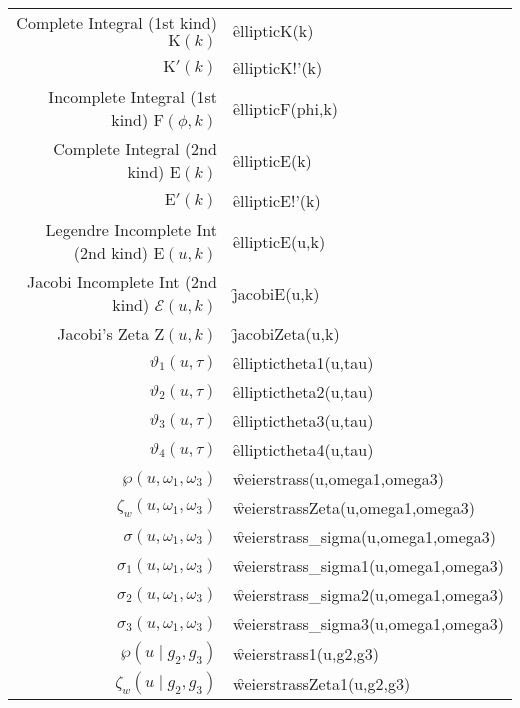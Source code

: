 {\begin{tabular}{r l}
Complete Integral (1st kind) $\mathrm{K}(k)$ & \f{ellipticK(k)}\\
$\mathrm{K}'(k)$ & \f{ellipticK!'(k)}\\
Incomplete Integral (1st kind) $\mathrm{F}(\phi,k)$ & \f{ellipticF(phi,k)}\\
Complete Integral (2nd kind) $\mathrm{E}(k)$ & \f{ellipticE(k)}\\
$\mathrm{E}'(k)$ & \f{ellipticE!'(k)}\\
Legendre Incomplete Int (2nd kind) $\mathrm{E}(u,k)$ & \f{ellipticE(u,k)}\\
Jacobi Incomplete Int (2nd kind) $\mathcal{E}(u,k)$ & \f{jacobiE(u,k)}\\
Jacobi's Zeta $\mathrm{Z}(u,k)$ & \f{jacobiZeta(u,k)}\\
$\vartheta_1(u,\tau)$ & \f{elliptictheta1(u,tau)}\\
$\vartheta_2(u,\tau)$ & \f{elliptictheta2(u,tau)}\\
$\vartheta_3(u,\tau)$ & \f{elliptictheta3(u,tau)}\\
$\vartheta_4(u,\tau)$ & \f{elliptictheta4(u,tau)}\\
$\wp(u,\omega_1, \omega_3)$ & \f{weierstrass(u,omega1,omega3)}\\
$\zeta_w(u,\omega_1, \omega_3)$ & \f{weierstrassZeta(u,omega1,omega3)}\\
$\sigma(u,\omega_1, \omega_3)$ & \f{weierstrass\_sigma(u,omega1,omega3)}\\
$\sigma_1(u,\omega_1, \omega_3)$ & \f{weierstrass\_sigma1(u,omega1,omega3)}\\
$\sigma_2(u,\omega_1, \omega_3)$ & \f{weierstrass\_sigma2(u,omega1,omega3)}\\
$\sigma_3(u,\omega_1, \omega_3)$ & \f{weierstrass\_sigma3(u,omega1,omega3)}\\
$\wp(u \mid g_2, g_3)$ & \f{weierstrass1(u,g2,g3)}\\
$\zeta_w(u \mid g_2, g_3)$ & \f{weierstrassZeta1(u,g2,g3)}\\[5pt]
\end{tabular}}
